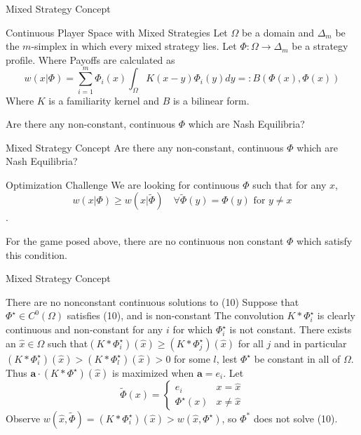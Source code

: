 \documentclass{beamer}
\begin{document}
\begin{frame}{Mixed Strategy Concept}
	\begin{block}{Continuous Player Space with Mixed Strategies}
		Let $\Omega$ be a domain and $\Delta_m$ be the $m$-simplex in which every mixed strategy lies. Let $\Phi:\Omega \rightarrow\Delta_m$ be a strategy profile. Where Payoffs are calculated as 
		\begin{equation}
			w(x|\Phi)=\sum_{i=1}^m \Phi_i(x)\int_\Omega K(x-y)\Phi_i(y)dy =:B(\Phi(x),\Phi(x)) 
		\end{equation} 
		Where $K$ is a familiarity kernel and $B$ is a bilinear form. 
	\end{block}
	Are there any non-constant, continuous $\Phi$ which are Nash Equilibria? 
\end{frame}

\begin{frame}{Mixed Strategy Concept}
	Are there any non-constant, continuous $\Phi$ which are Nash Equilibria?
	\begin{block}{Optimization Challenge}
		We are looking for continuous $\Phi$ such that for any $x$,
		\begin{equation}
			w(x|\Phi)\geq w(x|\tilde\Phi)\quad \forall \tilde \Phi(y) = \Phi (y) \text{ for } y\neq x
		\end{equation}. 
	\end{block}

	For the game posed above, there are no continuous non constant $\Phi$ which satisfy this condition. 
\end{frame}

\begin{frame}{Mixed Strategy Concept}
	\begin{block}{There are no nonconstant continuous solutions to (10)}
		Suppose that $\Phi^\star\in C^0(\Omega)$ satisfies (10), and is non-constant 
		The convolution $K*\Phi^\star_i$ is clearly continuous and  non-constant for any $i$ for which $\Phi^\star_i$ is not constant.  There exists an $\hat x\in \Omega$ such that$(K*\Phi^\star_i)(\hat x)\geq(K*\Phi^\star_j)(\hat x)$ for all $j$ and in particular $(K*\Phi^\star_i)(\hat x)>(K*\Phi^\star_l)(\hat x)>0$ for some $l$, lest $\Phi^\star$ be constant in all of $\Omega$. Thus $\mathbf{a}\cdot (K*\Phi^\star)(\hat x)$ is maximized when $\mathbf{a}=e_i$. Let  \begin{equation}\tilde{\Phi}(x)=\begin{cases} e_i&x=\hat x\\
				\Phi^\star(x)&x\neq \hat x \end{cases}
		\end{equation}
	Observe  $w(\hat x, \tilde{\Phi})=(K*\Phi_i^\star)(\hat x)>w(\hat x, \Phi^\star)$, so $\Phi^*$ does not solve (10).
	\end{block}
\end{frame}
	
\end{document}
